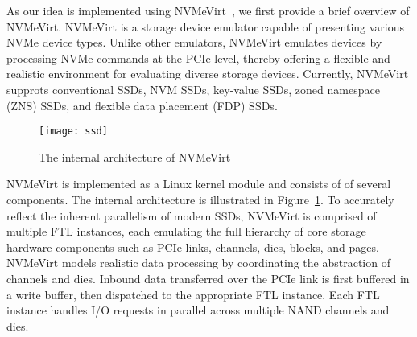 
As our idea is implemented using NVMeVirt~\cite{nvmevirt,empowering:tos23}, we first provide a brief overview of NVMeVirt.
NVMeVirt is a storage device emulator capable of presenting various NVMe device types.
Unlike other emulators, NVMeVirt emulates devices by processing NVMe commands at the PCIe level, thereby offering a flexible and realistic environment for evaluating diverse storage devices.
Currently, NVMeVirt supprots conventional SSDs, NVM SSDs, key-value SSDs, zoned namespace (ZNS) SSDs, and flexible data placement (FDP) SSDs.



\begin{figure}[t]
    \centering
    \texttt{[image: ssd]}
    \caption{The internal architecture of NVMeVirt}
    \label{fig:structure}
\end{figure}

NVMeVirt is implemented as a Linux kernel module and consists of of several components.
The internal architecture is illustrated in Figure~\ref{fig:structure}.
To accurately reflect the inherent parallelism of modern SSDs, NVMeVirt is comprised of multiple FTL instances, each emulating the full hierarchy of core storage hardware components such as PCIe links, channels, dies, blocks, and pages.
NVMeVirt models realistic data processing by coordinating the abstraction of channels and dies.
Inbound data transferred over the PCIe link is first buffered in a write buffer, then dispatched to the appropriate FTL instance.
Each FTL instance handles I/O requests in parallel across multiple NAND channels and dies.



